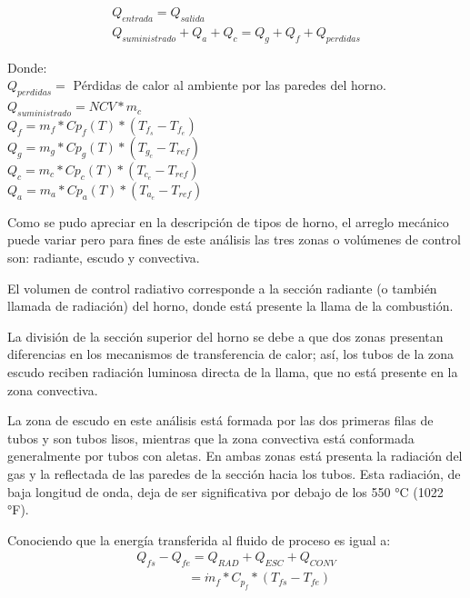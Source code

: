 \begin{equation}
    \label{eq:balance-global}
    \begin{gathered}
    Q_{entrada} = Q_{salida}\\
    Q_{suministrado} + Q_{a} + Q_{c} = 
    Q_{g} + Q_{f} + Q_{perdidas}
    \end{gathered}
\end{equation}
\par Donde:\\
$Q_{perdidas} =$ Pérdidas de calor al ambiente por las paredes del horno.\\
$Q_{suministrado} = NCV * m_{c}$\\
$Q_{f} = m_{f} * Cp_{f}(T) * (T_{f_s} - T_{f_e})$\\
$Q_{g} = m_{g} * Cp_{g}(T) * (T_{g_c} - T_{ref})$\\
$Q_{c} = m_{c} * Cp_{c}(T) * (T_{c_e} - T_{ref})$\\
$Q_{a} = m_{a} * Cp_{a}(T) * (T_{a_e} - T_{ref})$\\
\par Como se pudo apreciar en la descripción de tipos de horno, el arreglo mecánico puede variar pero para fines de este análisis las tres zonas o volúmenes de control son: radiante, escudo y convectiva. 
\par El volumen de control radiativo corresponde a la sección radiante (o también llamada de radiación) del horno, donde está presente la llama de la combustión.
\par La división de la sección superior del horno se debe a que dos zonas presentan diferencias en los mecanismos de transferencia de calor; así, los tubos de la zona escudo reciben radiación luminosa directa de la llama, que no está presente en la zona convectiva.
\par La zona de escudo en este análisis está formada por las dos primeras filas de tubos y son tubos lisos, mientras que la zona convectiva está conformada generalmente por tubos con aletas. En ambas zonas está presenta la radiación del gas y la reflectada de las paredes de la sección hacia los tubos. Esta radiación, de baja longitud de onda, deja de ser significativa por debajo de los 550 °C (1022 °F).
\par Conociendo que la energía transferida al fluido de proceso es igual a:
\begin{equation}
    \begin{gathered}
    Q_{fs} - Q_{fe} = Q_{RAD} + Q_{ESC} + Q_{CONV}\\
    \quad\quad\quad\quad = \dot m_f * C_{p_f} * (T_{fs} - T_{fe})
    \end{gathered}
\end{equation}
